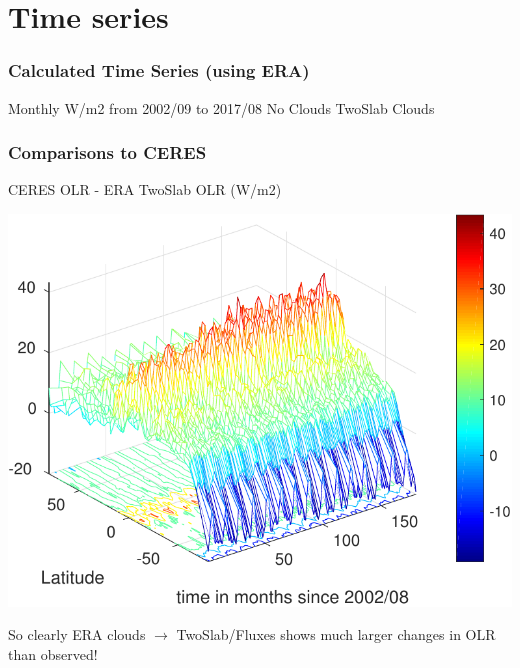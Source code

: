 \documentclass[10pt,t]{beamer}
\begin{document}
\section{Time series}
\begin{frame}
  \frametitle{Calculated Time Series (using ERA)}
  Monthly W/m2 from 2002/09 to 2017/08 \newline
  \hspace{0.50in} No Clouds  \hspace{1.75in} TwoSlab Clouds \\
  \begin{center}
  \end{center}
\end{frame}
\begin{frame}
  \frametitle{Comparisons to CERES}
  CERES OLR - ERA TwoSlab OLR  (W/m2)
  \begin{center}
    \noindent\includegraphics[width=0.625\linewidth]{Figs/ceresVSghgNcloudeffect_lat_time.pdf}
  \end{center}
  So clearly ERA clouds $\rightarrow$ TwoSlab/Fluxes shows much larger changes in OLR than observed!
\end{frame}
\end{document}
